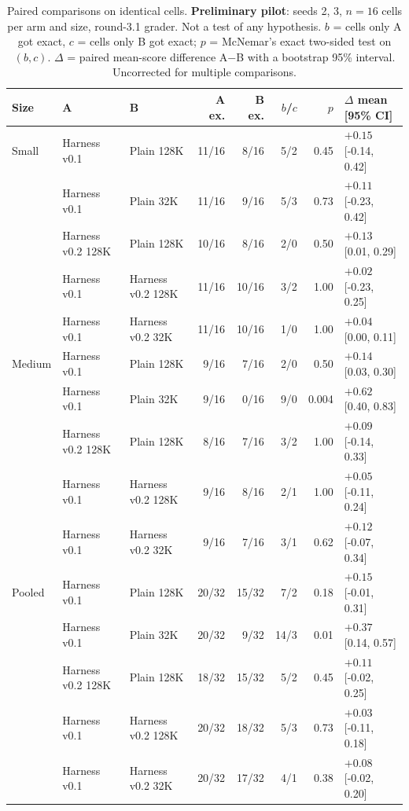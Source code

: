 \begin{table}[t]
\centering\small
\setlength{\tabcolsep}{4pt}
\caption{Paired comparisons on identical cells. \textbf{Preliminary pilot}: seeds 2, 3, $n{=}16$ cells per arm and size, round-3.1 grader. Not a test of any hypothesis. $b$ = cells only A got exact, $c$ = cells only B got exact; $p$ = McNemar's exact two-sided test on $(b, c)$. $\Delta$ = paired mean-score difference A$-$B with a bootstrap 95\% interval. Uncorrected for multiple comparisons.}
\label{tab:pilot-paired}
\begin{tabular}{lllrrrrl}
\toprule
Size & A & B & A ex. & B ex. & $b$/$c$ & $p$ & $\Delta$ mean [95\% CI] \\
\midrule
Small & Harness v0.1 & Plain 128K & 11/16 & 8/16 & 5/2 & 0.45 & $+0.15$ [-0.14, 0.42] \\
 & Harness v0.1 & Plain 32K & 11/16 & 9/16 & 5/3 & 0.73 & $+0.11$ [-0.23, 0.42] \\
 & Harness v0.2 128K & Plain 128K & 10/16 & 8/16 & 2/0 & 0.50 & $+0.13$ [0.01, 0.29] \\
 & Harness v0.1 & Harness v0.2 128K & 11/16 & 10/16 & 3/2 & 1.00 & $+0.02$ [-0.23, 0.25] \\
 & Harness v0.1 & Harness v0.2 32K & 11/16 & 10/16 & 1/0 & 1.00 & $+0.04$ [0.00, 0.11] \\
\midrule
Medium & Harness v0.1 & Plain 128K & 9/16 & 7/16 & 2/0 & 0.50 & $+0.14$ [0.03, 0.30] \\
 & Harness v0.1 & Plain 32K & 9/16 & 0/16 & 9/0 & 0.004 & $+0.62$ [0.40, 0.83] \\
 & Harness v0.2 128K & Plain 128K & 8/16 & 7/16 & 3/2 & 1.00 & $+0.09$ [-0.14, 0.33] \\
 & Harness v0.1 & Harness v0.2 128K & 9/16 & 8/16 & 2/1 & 1.00 & $+0.05$ [-0.11, 0.24] \\
 & Harness v0.1 & Harness v0.2 32K & 9/16 & 7/16 & 3/1 & 0.62 & $+0.12$ [-0.07, 0.34] \\
\midrule
Pooled & Harness v0.1 & Plain 128K & 20/32 & 15/32 & 7/2 & 0.18 & $+0.15$ [-0.01, 0.31] \\
 & Harness v0.1 & Plain 32K & 20/32 & 9/32 & 14/3 & 0.01 & $+0.37$ [0.14, 0.57] \\
 & Harness v0.2 128K & Plain 128K & 18/32 & 15/32 & 5/2 & 0.45 & $+0.11$ [-0.02, 0.25] \\
 & Harness v0.1 & Harness v0.2 128K & 20/32 & 18/32 & 5/3 & 0.73 & $+0.03$ [-0.11, 0.18] \\
 & Harness v0.1 & Harness v0.2 32K & 20/32 & 17/32 & 4/1 & 0.38 & $+0.08$ [-0.02, 0.20] \\
\bottomrule
\end{tabular}
\end{table}
